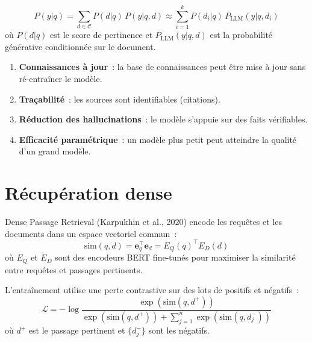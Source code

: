 \begin{formules}[title=\textbf{Formulation probabiliste du RAG}]
\[
    P(y | q) = \sum_{d \in \mathcal{C}} P(d | q) \, P(y | q, d)
    \approx \sum_{i=1}^{k} P(d_i | q) \, P_{\text{LLM}}(y | q, d_i)
\]
o\`u $P(d | q)$ est le score de pertinence et $P_{\text{LLM}}(y | q, d)$
est la probabilit\'e g\'en\'erative conditionn\'ee sur le document.
\end{formules}

\begin{proposition}
\begin{enumerate}
    \item \textbf{Connaissances \`a jour}~: la base de connaissances peut
    \^etre mise \`a jour sans r\'e-entra\^iner le mod\`ele.
    \item \textbf{Tra\c{c}abilit\'e}~: les sources sont identifiables
    (citations).
    \item \textbf{R\'eduction des hallucinations}~: le mod\`ele s'appuie
    sur des faits v\'erifiables.
    \item \textbf{Efficacit\'e param\'etrique}~: un mod\`ele plus petit
    peut atteindre la qualit\'e d'un grand mod\`ele.
\end{enumerate}
\end{proposition}

\section{R\'ecup\'eration dense}
\label{sec:rag:dense}

\begin{definition}
Dense Passage Retrieval (Karpukhin et al., 2020) encode les requ\^etes
et les documents dans un espace vectoriel commun~:
\[
    \text{sim}(q, d) = \mathbf{e}_q^\top \mathbf{e}_d
    = E_Q(q)^\top E_D(d)
\]
o\`u $E_Q$ et $E_D$ sont des encodeurs BERT fine-tun\'es pour maximiser
la similarit\'e entre requ\^etes et passages pertinents.
\end{definition}

\begin{definition}
L'entra\^inement utilise une perte contrastive sur des lots de positifs
et n\'egatifs~:
\[
    \mathcal{L} = -\log \frac{\exp(\text{sim}(q, d^+))}
    {\exp(\text{sim}(q, d^+)) + \sum_{j=1}^{n}
    \exp(\text{sim}(q, d_j^-))}
\]
o\`u $d^+$ est le passage pertinent et $\{d_j^-\}$ sont les n\'egatifs.
\end{definition}

